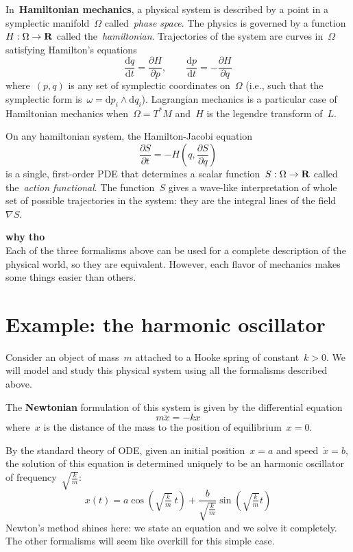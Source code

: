 In~{\bf Hamiltonian mechanics}, a physical system is described by a point in
a symplectic manifold~$\Omega$ called~\emph{phase space}.  The physics is
governed by a function~$H:\Omega\to\mathbf{R}$ called the~\emph{hamiltonian}.
Trajectories of the system are curves in~$\Omega$ satisfying Hamilton's
equations
\[
	\frac{\mathrm{d}q}{\mathrm{d}t}=\frac{\partial H}{\partial p},
	\qquad
	\frac{\mathrm{d}p}{\mathrm{d}t}=-\frac{\partial H}{\partial q}
\]
where~$(p,q)$ is any set of symplectic coordinates on~$\Omega$ (i.e., such
that the symplectic form is~$\omega=\mathrm{d}p_i\wedge\mathrm{d}q_i$).
Lagrangian mechanics is a particular case of Hamiltonian mechanics
when~$\Omega=T^*M$ and~$H$ is the legendre transform of~$L$.

On any hamiltonian system, the Hamilton-Jacobi equation
\[
	\frac{\partial S}{\partial t}
	=
	-H\left(q, \frac{\partial S}{\partial q}\right)
\]
is a single, first-order PDE that determines a scalar
function~$S:\Omega\to\mathbf{R}$ called the~\emph{action functional}.  The
function~$S$ gives a wave-like interpretation of whole set of possible
trajectories in the system: they are the integral lines of the field~$\nabla
S$.



{\bf why tho}\\
Each of the three formalisms above can be used for a complete description of
the physical world, so they are equivalent.  However, each flavor of
mechanics makes some things easier than others.

\section{Example: the harmonic oscillator}

Consider an object of mass~$m$ attached to a Hooke spring of constant~$k>0$.
We will model and study this physical system using all the formalisms
described above.

The {\bf Newtonian} formulation of this system is given by the differential
equation
\[
	m\ddot x = -kx
\]
where~$x$ is the distance of the mass to the position of equilibrium~$x=0$.

By the standard theory of ODE, given an initial position~$x=a$ and
speed~$\dot x = b$, the solution of this equation is determined uniquely to
be an harmonic oscillator of frequency~$\sqrt{\tfrac km}$:
\[
	x(t) =
	a\cos\left(\sqrt{\tfrac{k}{m}}\ t\right)
	+\frac{b}{\sqrt{\tfrac{k}{m}}}\sin\left(\sqrt{\tfrac{k}{m}} t\right)
\]
Newton's method shines here: we state an equation and we solve it completely.
The other formalisms will seem like overkill for this simple case.

